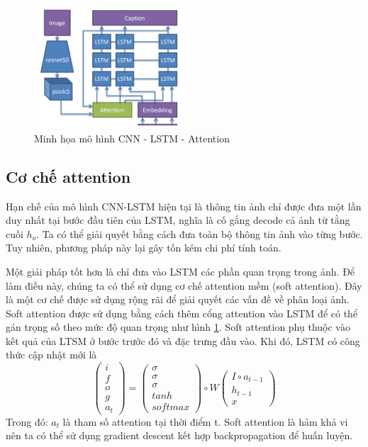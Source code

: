 \documentclass[conference]{IEEEtran}
\begin{document}
\begin{figure}[h]
\includegraphics[width=0.5\textwidth]{assets/architecture_CNN_LSTM_attention.png}
  \caption{Minh họa mô hình CNN - LSTM - Attention}
  \label{fig:CNN_LSTM_Attention}
\end{figure}

\subsection{Cơ chế attention}
Hạn chế của mô hình CNN-LSTM hiện tại là thông tin ảnh chỉ được đưa một lần duy nhất tại bước đầu tiên của LSTM, nghĩa là cố gắng decode cả ảnh từ tằng cuối $h_o$.
Ta có thể giải quyết bằng cách đưa toàn bộ thông tin ảnh vào từng bước.
Tuy nhiên, phương pháp này lại gây tốn kém chi phí tính toán.

Một giải pháp tốt hơn là chỉ đưa vào LSTM các phần quan trọng trong ảnh. Để làm điều này, chúng ta có thể sử dụng cơ chế attention mềm (soft attention). Đây là một cơ chế được sử dụng rộng rãi  
để giải quyết các vấn đề về phân loại ảnh. Soft attention được sử dụng bằng cách thêm cổng attention vào LSTM để có thể gán trọng số theo mức độ quan trọng như hình \ref{fig:CNN_LSTM_Attention}. Soft attention phụ thuộc vào kết quả của LTSM ở bước trước đó và đặc trưng đầu vào.  Khi đó, LSTM có công thức cập nhật mới là
$$
\begin{pmatrix}
i \\f \\o \\g \\a_t
\end{pmatrix}
= 
\begin{pmatrix}
\sigma \\ \sigma \\ \sigma \\ tanh \\ softmax
\end{pmatrix}
\circ
W
\begin{pmatrix}
I \circ a_{t-1} \\ h_{t-1} \\ x
\end{pmatrix}
$$
Trong đó: $a_t$ là tham số attention tại thời điểm t. Soft attention là hảm khả vi nên ta có thể sử dụng gradient descent kết hợp backpropagation để huấn luyện. 
\end{document}
